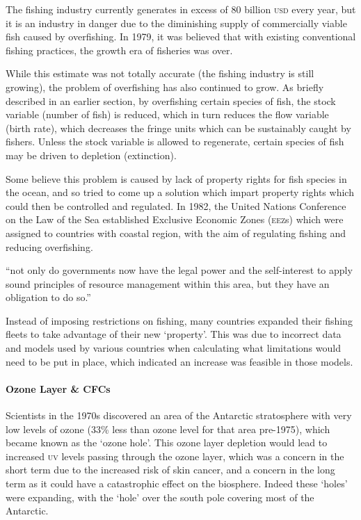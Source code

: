 The fishing industry currently generates in excess of 80 billion \textsc{usd} every year, but it is an industry in danger due to the diminishing supply of commercially viable fish caused by overfishing. In 1979, it was believed that with existing conventional fishing practices, the growth era of fisheries was over.

While this estimate was not totally accurate (the fishing industry is still growing), the problem of overfishing has also continued to grow. As briefly described in an earlier section, by overfishing certain species of fish, the stock variable (number of fish) is reduced, which in turn reduces the flow variable (birth rate), which decreases the fringe units which can be sustainably caught by fishers. Unless the stock variable is allowed to regenerate, certain species of fish may be driven to depletion (extinction).

Some believe this problem is caused by lack of property rights for fish species in the ocean, and so tried to come up a solution which impart property rights which could then be controlled and regulated. In 1982, the United Nations Conference on the Law of the Sea established Exclusive Economic Zones (\textsc{eez}s) which were assigned to countries with coastal region, with the aim of regulating fishing and reducing overfishing.~\cite{Canada-sea-law}

``not only do governments now have the legal power and the self-interest to apply sound principles of resource management within this area, but they have an obligation to do so.''

Instead of imposing restrictions on fishing, many countries expanded their fishing fleets to take advantage of their new `property'. This was due to incorrect data and models used by various countries when calculating what limitations would need to be put in place, which indicated an increase was feasible in those models.

\paragraph{Ozone Layer \& CFCs}

Scientists in the 1970s discovered an area of the Antarctic stratosphere with very low levels of ozone (33\% less than ozone level for that area pre-1975), which became known as the `ozone hole'. This ozone layer depletion would lead to increased \textsc{uv} levels passing through the ozone layer, which was a concern in the short term due to the increased risk of skin cancer, and a concern in the long term as it could have a catastrophic effect on the biosphere. Indeed these `holes' were expanding, with the `hole' over the south pole covering most of the Antarctic.

